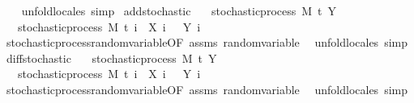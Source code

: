 \begin{isabellebody}
%
\isadelimproof
\ \ %
\endisadelimproof
%
\isatagproof
{}\isamarkupfalse%
\ {\isacharparenleft}{\kern0pt}unfold{\isacharunderscore}{\kern0pt}locales{\isacharparenright}{\kern0pt}\ simp%
\endisatagproof
{\isafoldproof}%
%
\isadelimproof
\isanewline
%
\endisadelimproof
\isanewline
{}\isamarkupfalse%
\ add{\isacharunderscore}{\kern0pt}stochastic{\isacharcolon}{\kern0pt}\isanewline
\ \ \ {\isachardoublequoteopen}stochastic{\isacharunderscore}{\kern0pt}process\ M\ t\ Y{\isachardoublequoteclose}\isanewline
\ \ \ {\isachardoublequoteopen}stochastic{\isacharunderscore}{\kern0pt}process\ M\ t\ {\isacharparenleft}{\kern0pt}{\isasymlambda}i\ {\isasymxi}{\isachardot}{\kern0pt}\ X\ i\ {\isasymxi}\ {\isacharplus}{\kern0pt}\ Y\ i\ {\isasymxi}{\isacharparenright}{\kern0pt}{\isachardoublequoteclose}\isanewline
%
\isadelimproof
\ \ %
\endisadelimproof
%
\isatagproof
{}\isamarkupfalse%
\ stochastic{\isacharunderscore}{\kern0pt}process{\isachardot}{\kern0pt}random{\isacharunderscore}{\kern0pt}variable{\isacharbrackleft}{\kern0pt}OF\ assms{\isacharbrackright}{\kern0pt}\ random{\isacharunderscore}{\kern0pt}variable\ \isamarkupfalse%
\ {\isacharparenleft}{\kern0pt}unfold{\isacharunderscore}{\kern0pt}locales{\isacharparenright}{\kern0pt}\ simp%
\endisatagproof
{\isafoldproof}%
%
\isadelimproof
\isanewline
%
\endisadelimproof
\isanewline
{}\isamarkupfalse%
\ diff{\isacharunderscore}{\kern0pt}stochastic{\isacharcolon}{\kern0pt}\isanewline
\ \ \ {\isachardoublequoteopen}stochastic{\isacharunderscore}{\kern0pt}process\ M\ t\ Y{\isachardoublequoteclose}\isanewline
\ \ \ {\isachardoublequoteopen}stochastic{\isacharunderscore}{\kern0pt}process\ M\ t\ {\isacharparenleft}{\kern0pt}{\isasymlambda}i\ {\isasymxi}{\isachardot}{\kern0pt}\ X\ i\ {\isasymxi}\ {\isacharminus}{\kern0pt}\ Y\ i\ {\isasymxi}{\isacharparenright}{\kern0pt}{\isachardoublequoteclose}\isanewline
%
\isadelimproof
\ \ %
\endisadelimproof
%
\isatagproof
{}\isamarkupfalse%
\ stochastic{\isacharunderscore}{\kern0pt}process{\isachardot}{\kern0pt}random{\isacharunderscore}{\kern0pt}variable{\isacharbrackleft}{\kern0pt}OF\ assms{\isacharbrackright}{\kern0pt}\ random{\isacharunderscore}{\kern0pt}variable\ \isamarkupfalse%
\ {\isacharparenleft}{\kern0pt}unfold{\isacharunderscore}{\kern0pt}locales{\isacharparenright}{\kern0pt}\ simp%
\endisatagproof

\end{isabellebody}
